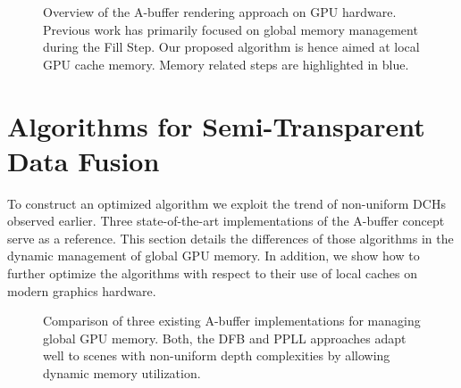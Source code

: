 \documentclass{egpubl}
\newcommand{\ab}{\mbox{A-buffer}}
\newcommand{\dch}{DCH}
\begin{document}
\newcommand{\sClear}{Clear Step}
\newcommand{\sFill}{Fill Step}
\newcommand{\sResolve}{Resolve Step}

\newcommand{\sCount}{Count Step}
\newcommand{\sSegment}{Segmentation Step}
\newcommand{\sTrigger}{Per-Segment Resolve}

\newcommand{\las}{L} %
\newcommand{\abs}{ABuffer\_frag}







\begin{figure}[t]
  \centering
    \graphicspath{{figures/}}%
    {\sffamily\footnotesize}
  \caption{\label{fig:abuffer-flowchart}%
	Overview of the \ab{} rendering approach on GPU hardware. 
	Previous work has primarily focused on global memory management during the \sFill. 
	Our proposed algorithm is hence aimed at local GPU cache memory. 
	Memory related steps are highlighted in blue.
   }
\end{figure}


\section{Algorithms for Semi-Transparent Data Fusion}
\label{sec:oit-global}

To construct an optimized algorithm we exploit the trend of non-uniform \dch{}s observed earlier.
Three state-of-the-art implementations of the \ab{} concept serve as a reference.
This section details the differences of those algorithms in the dynamic management of {global} GPU memory.
In addition, we show how to further optimize the algorithms with respect to their use of {local} caches on modern graphics hardware.

\begin{figure}[t]
  \centering
    \def\svgwidth{\textwidth}%
    \graphicspath{{figures/}}%
    {\sffamily\footnotesize}
  \caption{\label{fig:abuffer-global}%
    Comparison of three existing \ab{} implementations for managing global GPU memory. 
    Both, the DFB and PPLL approaches adapt well to scenes with non-uniform depth complexities by allowing dynamic memory utilization. 
  }
\end{figure}
\end{document}
